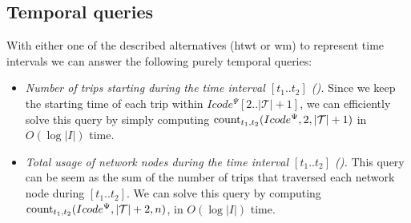 	\subsection{Temporal queries}
	\label{sec:ctr:alg:tq}
	With either one of the described alternatives (\gls{htwt} or \gls{wm}) to represent time intervals we can answer the following purely temporal queries:
	
	\begin{itemize}

	\item {\em Number of trips starting during the time interval $[t_1..t_2]$ (\startT).} Since we keep the
	starting time of each trip within $Icode^{\Psi}[2..|\mathcal{T}|+1]$, we can efficiently solve this query 
	by simply computing $\operatorname{count}_{t_1,t_2}(Icode^{\Psi},2,|\mathcal{T}|+1)$ in $O(\log|I|)$ time.

	\item  {\em Total usage of network nodes during the time interval $[t_1..t_2]$ (\loadT).} This query
	can be seem as the sum of the number of trips that traversed each network node during $[t_1..t_2]$.
	We can solve this query by computing $\operatorname{count}_{t_1,t_2}(Icode^{\Psi},|\mathcal{T}|+2,n)$, in $O(\log|I|)$ time.


\end{itemize}
